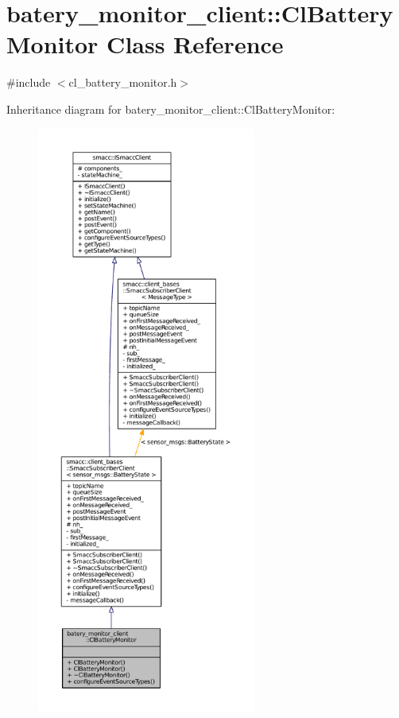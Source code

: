 \hypertarget{classbatery__monitor__client_1_1ClBatteryMonitor}{}\section{batery\+\_\+monitor\+\_\+client\+:\+:Cl\+Battery\+Monitor Class Reference}
\label{classbatery__monitor__client_1_1ClBatteryMonitor}


{\ttfamily \#include $<$cl\+\_\+battery\+\_\+monitor.\+h$>$}



Inheritance diagram for batery\+\_\+monitor\+\_\+client\+:\+:Cl\+Battery\+Monitor\+:
\nopagebreak
\begin{figure}[H]
\begin{center}
\leavevmode
\includegraphics[height=550pt]{classbatery__monitor__client_1_1ClBatteryMonitor__inherit__graph}
\end{center}
\end{figure}


